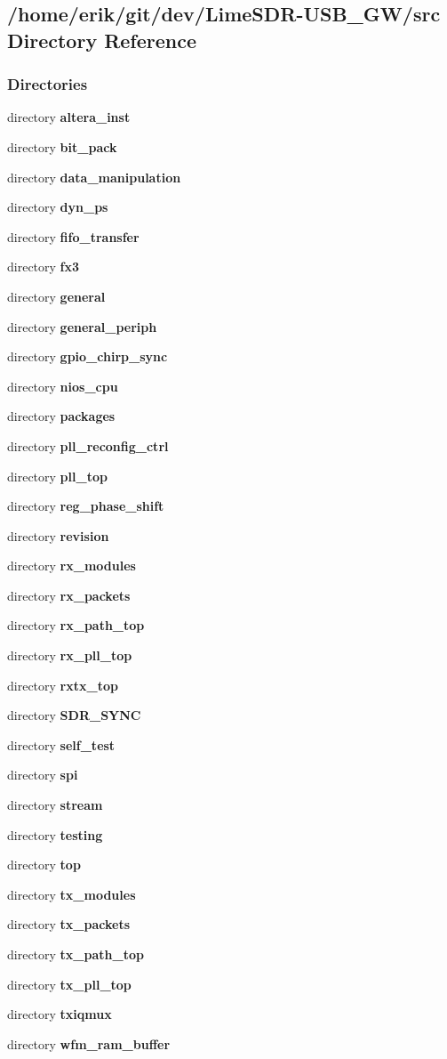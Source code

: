 \subsection{/home/erik/git/dev/\+Lime\+S\+D\+R-\/\+U\+S\+B\+\_\+\+G\+W/src Directory Reference}
\label{dir_e68e41d1c4edcf2d61aaa5c8708b8a75}
\subsubsection*{Directories}
\begin{DoxyCompactItemize}
\item 
directory {\bf altera\+\_\+inst}
\item 
directory {\bf bit\+\_\+pack}
\item 
directory {\bf data\+\_\+manipulation}
\item 
directory {\bf dyn\+\_\+ps}
\item 
directory {\bf fifo\+\_\+transfer}
\item 
directory {\bf fx3}
\item 
directory {\bf general}
\item 
directory {\bf general\+\_\+periph}
\item 
directory {\bf gpio\+\_\+chirp\+\_\+sync}
\item 
directory {\bf nios\+\_\+cpu}
\item 
directory {\bf packages}
\item 
directory {\bf pll\+\_\+reconfig\+\_\+ctrl}
\item 
directory {\bf pll\+\_\+top}
\item 
directory {\bf reg\+\_\+phase\+\_\+shift}
\item 
directory {\bf revision}
\item 
directory {\bf rx\+\_\+modules}
\item 
directory {\bf rx\+\_\+packets}
\item 
directory {\bf rx\+\_\+path\+\_\+top}
\item 
directory {\bf rx\+\_\+pll\+\_\+top}
\item 
directory {\bf rxtx\+\_\+top}
\item 
directory {\bf S\+D\+R\+\_\+\+S\+Y\+NC}
\item 
directory {\bf self\+\_\+test}
\item 
directory {\bf spi}
\item 
directory {\bf stream}
\item 
directory {\bf testing}
\item 
directory {\bf top}
\item 
directory {\bf tx\+\_\+modules}
\item 
directory {\bf tx\+\_\+packets}
\item 
directory {\bf tx\+\_\+path\+\_\+top}
\item 
directory {\bf tx\+\_\+pll\+\_\+top}
\item 
directory {\bf txiqmux}
\item 
directory {\bf wfm\+\_\+ram\+\_\+buffer}
\end{DoxyCompactItemize}
